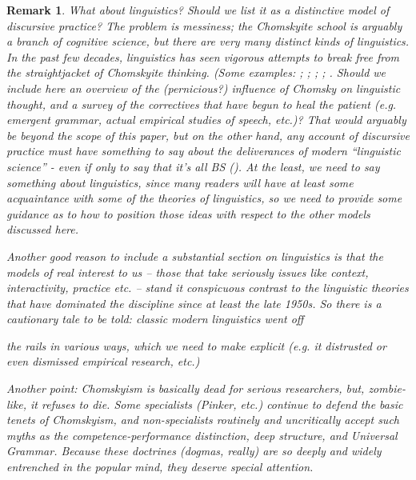 \documentclass[11pt,twoside]{article}
\newtheorem{remark}{Remark}
\begin{document}
\begin{remark}
  What about linguistics?  Should we list it as a distinctive model of
  discursive practice?  The problem is messiness; the Chomskyite
  school is arguably a branch of cognitive science, but there are very
  many distinct kinds of linguistics.  In the past few decades,
  linguistics has seen vigorous attempts to break free from the
  straightjacket of Chomskyite thinking.  (Some examples:
  \cite{evans_myth_2009}; \cite{christiansen_myth_2009};
  \cite{tomasello_language_1995}; \cite{tomasello_universal_2009};
  \cite{minsky_chomsky_irrelevance}.  Should we include here an
  overview of the (pernicious?) influence of Chomsky on linguistic
  thought, and a survey of the correctives that have begun to heal the
  patient (e.g. emergent grammar, actual empirical studies of speech,
  etc.)?  That would arguably be beyond the scope of this paper, but
  on the other hand, any account of discursive practice must have
  something to say about the deliverances of modern ``linguistic
  science'' - even if only to say that it's all BS
  (\cite{baker_language_1986}).  At the least, we need to say
  something about linguistics, since many readers will have at least
  some acquaintance with some of the theories of linguistics, so we
  need to provide some guidance as to how to position those ideas with
  respect to the other models discussed here.

  Another good reason to include a substantial section on linguistics
  is that the models of real interest to us -- those that take
  seriously issues like context, interactivity, practice etc. -- stand
  it conspicuous contrast to the linguistic theories that have
  dominated the discipline since at least the late 1950s.  So there is
  a cautionary tale to be told: classic modern linguistics went off

  the rails in various ways, which we need to make explicit (e.g. it
  distrusted or even dismissed empirical research, etc.)

  Another point: Chomskyism is basically dead for serious researchers,
  but, zombie-like, it refuses to die.  Some specialists (Pinker,
  etc.) continue to defend the basic tenets of Chomskyism, and
  non-specialists routinely and uncritically accept such myths as the
  competence-performance distinction, deep structure, and Universal
  Grammar.  Because these doctrines (dogmas, really) are so deeply and
  widely entrenched in the popular mind, they deserve special
  attention.
\end{remark}
\end{document}
